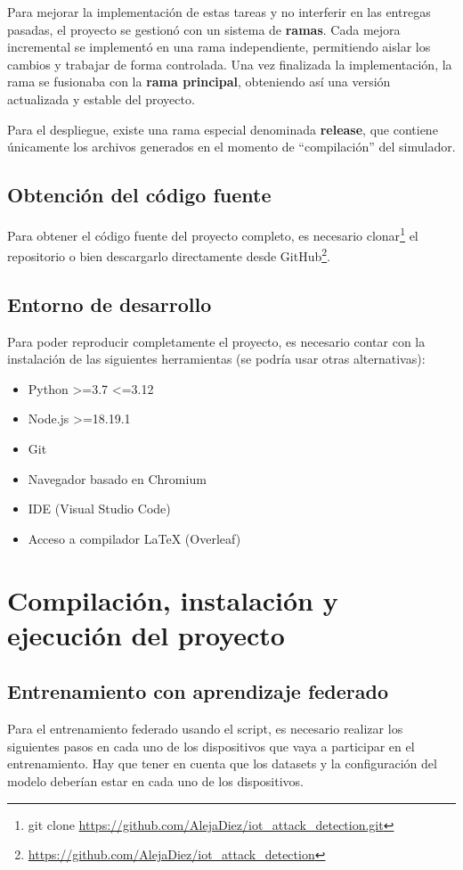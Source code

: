 Para mejorar la implementación de estas tareas y no interferir en las entregas pasadas, el proyecto se gestionó con un sistema de \textbf{ramas}. Cada mejora incremental se implementó en una rama independiente, permitiendo aislar los cambios y trabajar de forma controlada. Una vez finalizada la implementación, la rama se fusionaba con la \textbf{rama principal}, obteniendo así una versión actualizada y estable del proyecto.

Para el despliegue, existe una rama especial denominada \textbf{release}, que contiene únicamente los archivos generados en el momento de ``compilación'' del simulador.

\subsection{Obtención del código fuente}
\label{subsec:CodigoFuente}
Para obtener el código fuente del proyecto completo, es necesario clonar\footnote{git clone \url{https://github.com/AlejaDiez/iot_attack_detection.git}} el repositorio o bien descargarlo directamente desde GitHub\footnote{\url{https://github.com/AlejaDiez/iot_attack_detection}}.

\subsection{Entorno de desarrollo}
\label{subsec:EntornoDesarrollo}
Para poder reproducir completamente el proyecto, es necesario contar con la instalación de las siguientes herramientas (se podría usar otras alternativas):
\begin{itemize}
    \item Python >=3.7 <=3.12
    \item Node.js >=18.19.1
    \item Git
    \item Navegador basado en Chromium
    \item IDE (Visual Studio Code)
    \item Acceso a compilador LaTeX (Overleaf)
\end{itemize}

\section{Compilación, instalación y ejecución del proyecto}
\label{sec:CompilacionInstalacion}
\subsection{Entrenamiento con aprendizaje federado}
\label{subsec:ConfiguracionAprendizajeFederado}
Para el entrenamiento federado usando el script, es necesario realizar los siguientes pasos en cada uno de los dispositivos que vaya a participar en el entrenamiento. Hay que tener en cuenta que los datasets y la configuración del modelo deberían estar en cada uno de los dispositivos.

